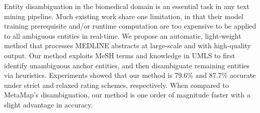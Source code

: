 Entity disambiguation in the biomedical domain is an essential task in any text mining pipeline. Much existing work share one limitation, in that their model training prerequisite and/or runtime computation are too expensive to be applied to all ambiguous entities in real-time. We propose an automatic, light-weight method that processes MEDLINE abstracts at large-scale and with high-quality output. Our method exploits MeSH terms and knowledge in UMLS to first identify unambiguous anchor entities, and then disambiguate remaining entities via heuristics. Experiments showed that our method is 79.6\% and 87.7\% accurate under strict and relaxed rating schemes, respectively. When compared to MetaMap's disambiguation, our method is one order of magnitude faster with a slight advantage in accuracy.
